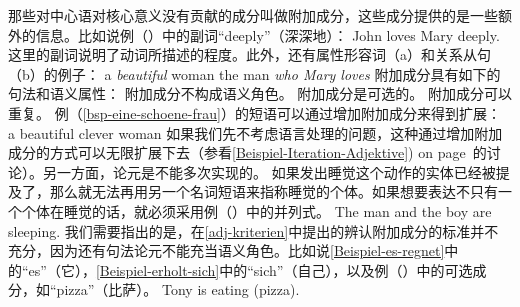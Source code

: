 那些对中心语对核心意义没有贡献的成分叫做附加成分，这些成分提供的是一些额外的信息。比如说例（）中的副词“deeply”（深深地）：
\ea
John loves Mary deeply.
\z
这里的副词说明了动词所描述的程度。此外，还有属性形容词（a）和关系从句（b）的例子：
\eal
\ex\label{bsp-eine-schoene-frau}
a {\em beautiful\/} woman
\ex the man {\em who Mary loves\/}
\zl
附加成分具有如下的句法和语义属性：
\eal
\label{adj-kriterien}
\ex 附加成分不构成语义角色。
\ex 附加成分是可选的。
\ex 附加成分可以重复。
\zl
例（\ref{bsp-eine-schoene-frau}）的短语可以通过增加附加成分来得到扩展：
\ea
a beautiful clever woman
\z
如果我们先不考虑语言处理的问题，这种通过增加附加成分的方式可以无限扩展下去（参看\ref{Beispiel-Iteration-Adjektive}) on page~\pageref{Beispiel-Iteration-Adjektive}的讨论）。另一方面，论元是不能多次实现的。
\z
如果发出睡觉这个动作的实体已经被提及了，那么就无法再用另一个名词短语来指称睡觉的个体。如果想要表达不只有一个个体在睡觉的话，就必须采用例（）中的并列式。
\ea
The man and the boy are sleeping.
\z
我们需要指出的是，在\ref{adj-kriterien}中提出的辨认附加成分的标准并不充分，因为还有句法论元不能充当语义角色。比如说\ref{Beispiel-es-regnet}中的“es”（它），\ref{Beispiel-erholt-sich}中的“sich”（自己），以及例（）中的可选成分，如“pizza”（比萨）。
\ea
Tony is eating (pizza).
\z

